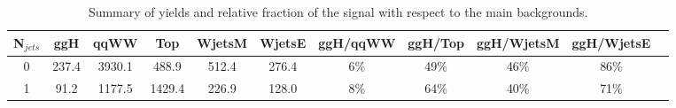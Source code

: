 \begin{table}
\begin{center}
\begin{tabular}{c | c c c c c | c  c  c c c }
\hline
N$_{jets}$ & ggH & qqWW & Top & WjetsM & WjetsE & ggH/qqWW & ggH/Top & ggH/WjetsM & ggH/WjetsE \\
\hline
0 & 237.4 & 3930.1 & 488.9  & 512.4 & 276.4 & 6\% & 49\% & 46\% &  86\%\\
1 & 91.2  & 1177.5 & 1429.4 & 226.9 & 128.0 & 8\% & 64\% & 40\% &  71\%\\
\hline
\end{tabular}
\caption{Summary of yields and relative fraction of the signal with respect to the main backgrounds.}
\label{tab:yield_summary}
\end{center}
\end{table}

